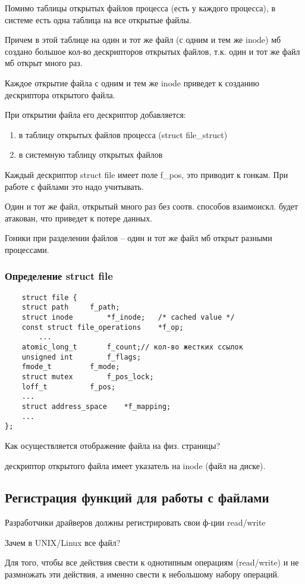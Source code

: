 Помимо таблицы открытых файлов процесса (есть у каждого процесса), в системе есть одна таблица на все открытые файлы.

Причем в этой таблице на один и тот же файл (с одним и тем же inode) мб создано большое кол-во дескрипторов открытых файлов, т.к. один и тот же файл мб открыт много раз. 

Каждое открытие файла с одним и тем же inode приведет к созданию дескриптора открытого файла.

При открытии файла его дескриптор добавляется:
\begin{enumerate}
    \item в таблицу открытых файлов процесса (struct file\_struct)
    \item в системную таблицу открытых файлов
\end{enumerate}

Каждый дескриптор struct file имеет поле f\_pos, это приводит к гонкам. При работе с файлами это надо учитывать.

Один и тот же файл, открытый много раз без соотв. способов взаимоискл. будет атакован, что приведет к потере данных.

Гоники при разделении файлов -- один и тот же файл мб открыт разными процессами.

\subsubsection{Определение struct file}
\begin{lstlisting}
    struct file {
	struct path		f_path;
	struct inode		*f_inode;	/* cached value */
	const struct file_operations	*f_op;
        ...
	atomic_long_t		f_count;// кол-во жестких ссылок
	unsigned int 		f_flags;
	fmode_t			f_mode;
	struct mutex		f_pos_lock;
	loff_t			f_pos;
	...
	struct address_space	*f_mapping;
	...
};
\end{lstlisting}
Как осуществляется отображение файла на физ. страницы?

дескриптор открытого файла имеет указатель на inode (файл на диске).

\subsection{Регистрация функций для работы с файлами}
Разработчики драйверов должны регистрировать свои ф-ции read/write

Зачем в UNIX/Linux все файл?

Для того, чтобы все действия свести к однотипным операциям (read/write) и не размножать эти действия, а именно свести к небольшому набору операций.

